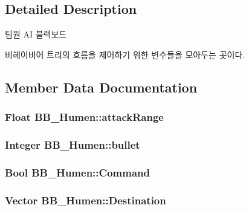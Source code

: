 \subsection{Detailed Description}
팀원 AI 블랙보드 

비헤이비어 트리의 흐름을 제어하기 위한 변수들을 모아두는 곳이다. 

\subsection{Member Data Documentation}
\subsubsection[{\texorpdfstring{attack\+Range}{attackRange}}]{\setlength{\rightskip}{0pt plus 5cm}Float B\+B\+\_\+\+Humen\+::attack\+Range}\hypertarget{class_b_b___humen_a9fb506718878e67dd7ce4889188fd9c3}{}\label{class_b_b___humen_a9fb506718878e67dd7ce4889188fd9c3}
\subsubsection[{\texorpdfstring{bullet}{bullet}}]{\setlength{\rightskip}{0pt plus 5cm}Integer B\+B\+\_\+\+Humen\+::bullet}\hypertarget{class_b_b___humen_a87f003bcd85b60d96e6ef1ebab51976e}{}\label{class_b_b___humen_a87f003bcd85b60d96e6ef1ebab51976e}
\subsubsection[{\texorpdfstring{Command}{Command}}]{\setlength{\rightskip}{0pt plus 5cm}Bool B\+B\+\_\+\+Humen\+::\+Command}\hypertarget{class_b_b___humen_a5f3cc37acdcbf06281e92a1792354864}{}\label{class_b_b___humen_a5f3cc37acdcbf06281e92a1792354864}
\subsubsection[{\texorpdfstring{Destination}{Destination}}]{\setlength{\rightskip}{0pt plus 5cm}Vector B\+B\+\_\+\+Humen\+::\+Destination}\hypertarget{class_b_b___humen_a52f772a3da5b3c23c6ff239571573a10}{}\label{class_b_b___humen_a52f772a3da5b3c23c6ff239571573a10}
